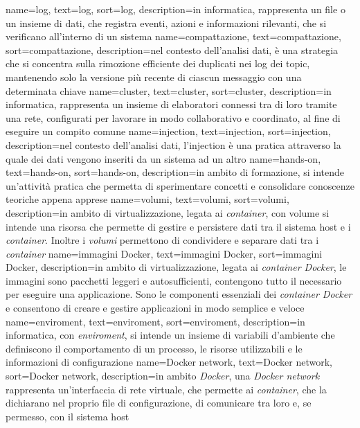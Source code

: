 {
    name={log},
    text=log,
    sort=log,
    description={in informatica, rappresenta un file o un insieme di dati, che registra eventi, azioni e informazioni rilevanti, 
    che si verificano all'interno di un sistema}
}
{
    name={compattazione},
    text=compattazione,
    sort=compattazione,
    description={nel contesto dell'analisi dati, è una strategia che si concentra sulla rimozione efficiente dei duplicati nei log dei topic, mantenendo solo la versione più recente di ciascun messaggio con una determinata chiave}
}
{
    name={cluster},
    text=cluster,
    sort=cluster,
    description={in informatica, rappresenta un insieme di elaboratori connessi tra di loro tramite una rete, configurati 
    per lavorare in modo collaborativo e coordinato, al fine di eseguire un compito comune}
}
{
    name={injection},
    text=injection,
    sort=injection,
    description={nel contesto dell'analisi dati, l'injection è  una pratica attraverso la quale dei dati 
    vengono inseriti da un sistema ad un altro}
}
{
    name={hands-on},
    text=hands-on,
    sort=hands-on,
    description={in ambito di formazione, si intende un'attività pratica che permetta di sperimentare 
    concetti e consolidare conoscenze teoriche appena apprese}
}
{
    name={volumi},
    text=volumi,
    sort=volumi,
    description={in ambito di virtualizzazione, legata ai \textit{container}, con volume si intende una risorsa che permette di gestire 
    e persistere dati tra il sistema host e i \textit{container}. Inoltre i \textit{volumi} permettono di condividere e separare 
    dati tra i \textit{container}}
}
{
    name={immagini Docker},
    text=immagini Docker,
    sort=immagini Docker,
    description={in ambito di virtualizzazione, legata ai \textit{container Docker}, le immagini sono pacchetti leggeri e autosufficienti,
    contengono tutto il necessario per eseguire una applicazione. Sono le componenti essenziali dei \textit{container Docker} e consentono di 
    creare e gestire applicazioni in modo semplice e veloce}
}
{
    name={enviroment},
    text=enviroment,
    sort=enviroment,
    description={in informatica, con \textit{enviroment}, si intende un insieme di variabili d'ambiente che definiscono il comportamento di un processo, le risorse utilizzabili e le informazioni di configurazione}
}
{
    name={Docker network},
    text=Docker network,
    sort=Docker network,
    description={in ambito \textit{Docker}, una \textit{Docker network} rappresenta un'interfaccia di rete virtuale, che permette ai \textit{container}, che la dichiarano nel proprio file di configurazione, di comunicare tra loro e, se permesso, con il sistema host}
}
